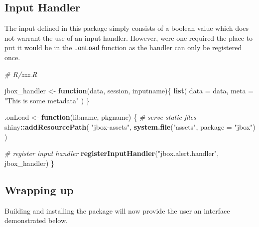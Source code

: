 \documentclass[
]{krantz}
\makeatletter
\newenvironment{Shaded}{\begin{snugshade}}{\end{snugshade}}
\newcommand{\CommentTok}[1]{\textcolor[rgb]{0.37,0.37,0.37}{\textit{#1}}}
\newcommand{\ControlFlowTok}[1]{\textcolor[rgb]{0.27,0.27,0.27}{\textbf{#1}}}
\newcommand{\DataTypeTok}[1]{\textcolor[rgb]{0.27,0.27,0.27}{#1}}
\newcommand{\KeywordTok}[1]{\textcolor[rgb]{0.27,0.27,0.27}{\textbf{#1}}}
\newcommand{\NormalTok}[1]{#1}
\newcommand{\OperatorTok}[1]{\textcolor[rgb]{0.43,0.43,0.43}{\textbf{#1}}}
\newcommand{\StringTok}[1]{\textcolor[rgb]{0.5,0.5,0.5}{#1}}
\newenvironment{kframe}{%
\medskip{}
\setlength{\fboxsep}{.8em}
 \def\at@end@of@kframe{}%
 \ifinner\ifhmode%
  \def\at@end@of@kframe{\end{minipage}}%
  \begin{minipage}{\columnwidth}%
 \fi\fi%
 \def\FrameCommand##1{\hskip\@totalleftmargin \hskip-\fboxsep
 \colorbox{shadecolor}{##1}\hskip-\fboxsep
     \hskip-\linewidth \hskip-\@totalleftmargin \hskip\columnwidth}%
 \MakeFramed {\advance\hsize-\width
   \@totalleftmargin\z@ \linewidth\hsize
   \@setminipage}}%
 {\par\unskip\endMakeFramed%
 \at@end@of@kframe}
\renewenvironment{Shaded}{\begin{kframe}}{\end{kframe}}
\makeatother
\begin{document}
\hypertarget{input-handler}{%
\subsection*{Input Handler}\label{input-handler}}


The input defined in this package simply consists of a boolean value which does not warrant the use of an input handler. However, were one required the place to put it would be in the \texttt{.onLoad} function as the handler can only be registered once.

\begin{Shaded}
\begin{Highlighting}[]
\CommentTok{\# R/zzz.R}

\NormalTok{jbox\_handler \textless{}{-}}\StringTok{ }\ControlFlowTok{function}\NormalTok{(data, session, inputname)\{}
  \KeywordTok{list}\NormalTok{(}
    \DataTypeTok{data =}\NormalTok{ data,}
    \DataTypeTok{meta =} \StringTok{"This is some metadata"}
\NormalTok{  )}
\NormalTok{\}}

\NormalTok{.onLoad \textless{}{-}}\StringTok{ }\ControlFlowTok{function}\NormalTok{(libname, pkgname) \{}
  \CommentTok{\# serve static files}
\NormalTok{  shiny}\OperatorTok{::}\KeywordTok{addResourcePath}\NormalTok{(}
    \StringTok{"jbox{-}assets"}\NormalTok{,}
    \KeywordTok{system.file}\NormalTok{(}\StringTok{"assets"}\NormalTok{, }\DataTypeTok{package =} \StringTok{"jbox"}\NormalTok{)}
\NormalTok{  )}

  \CommentTok{\# register input handler}
  \KeywordTok{registerInputHandler}\NormalTok{(}\StringTok{"jbox.alert.handler"}\NormalTok{, jbox\_handler)}
\NormalTok{\}}
\end{Highlighting}
\end{Shaded}

\hypertarget{wrapping-up}{%
\subsection*{Wrapping up}\label{wrapping-up}}


Building and installing the package will now provide the user an interface demonstrated below.
\end{document}
